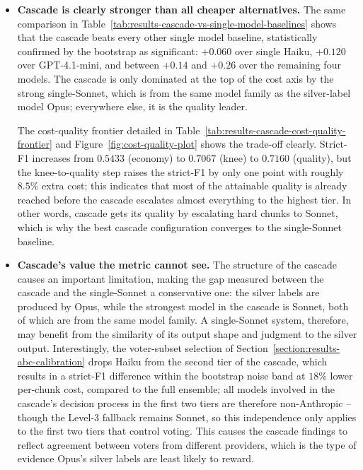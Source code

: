 \begin{itemize}[label={},leftmargin=1.5em]

    \item \textbf{Cascade is clearly stronger than all cheaper alternatives.} The same comparison in Table~\ref{tab:results-cascade-vs-single-model-baselines} shows that the cascade beats every other single model baseline, statistically confirmed by the bootstrap as significant: $+0.060$ over single Haiku, $+0.120$ over GPT-4.1-mini, and between $+0.14$ and $+0.26$ over the remaining four models. The cascade is only dominated at the top of the cost axis by the strong single-Sonnet, which is from the same model family as the silver-label model Opus; everywhere else, it is the quality leader. 
    
    The cost-quality frontier detailed in Table~\ref{tab:results-cascade-cost-quality-frontier} and Figure~\ref{fig:cost-quality-plot} shows the trade-off clearly. Strict-F1 increases from $0.5433$ (economy) to $0.7067$ (knee) to $0.7160$ (quality), but the knee-to-quality step raises the strict-F1 by only one point with roughly $8.5\%$ extra cost; this indicates that most of the attainable quality is already reached before the cascade escalates almost everything to the highest tier. In other words, cascade gets its quality by escalating hard chunks to Sonnet, which is why the best cascade configuration converges to the single-Sonnet baseline. 
    
    \item \textbf{Cascade's value the metric cannot see.} The structure of the cascade causes an important limitation, making the gap measured between the cascade and the single-Sonnet a conservative one: the silver labels are produced by Opus, while the strongest model in the cascade is Sonnet, both of which are from the same model family. A single-Sonnet system, therefore, may benefit from the similarity of its output shape and judgment to the silver output. Interestingly, the voter-subset selection of Section~\ref{section:results-abc-calibration} drops Haiku from the second tier of the cascade, which results in a strict-F1 difference within the bootstrap noise band at $18\%$ lower per-chunk cost, compared to the full ensemble; all models involved in the cascade's decision process in the first two tiers are therefore non-Anthropic -- though the Level-3 fallback remains Sonnet, so this independence only applies to the first two tiers that control voting. This causes the cascade findings to reflect agreement between voters from different providers, which is the type of evidence Opus's silver labels are least likely to reward. 
    

\end{itemize}
